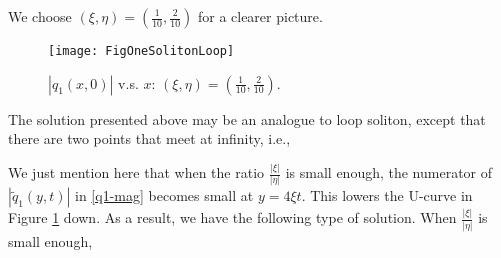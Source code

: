 \documentclass[11pt]{article}
\begin{document}
We choose $(\xi,\eta)=(\frac{1}{10},\frac{2}{10})$ for a clearer picture. 

\begin{figure}[htbp] %
   \centering
   \texttt{[image: FigOneSolitonLoop]} 
   \caption{$|q_1(x,0)|$ v.s. $x$: $(\xi,\eta)=(\frac{1}{10},\frac{2}{10})$.}
   \label{fig3}
\end{figure}

The solution presented above may be an analogue to loop soliton, except that there are two points that meet at infinity, i.e.,
\begin{figure}[htbp]
\centering
{}
\end{figure}

We just mention here that when the ratio $\frac{|\xi|}{|\eta|}$ is small enough, the numerator of $|\tilde{q}_1(y,t)|$ in \eqref{q1-mag} becomes small at $y=4\xi t$. This lowers the U-curve in Figure \ref{fig3} down. As a result, we have the following type of solution. When $\frac{|\xi|}{|\eta|}$ is small enough,

\begin{figure}[htbp]
\centering
{}
\end{figure}


\end{document}
